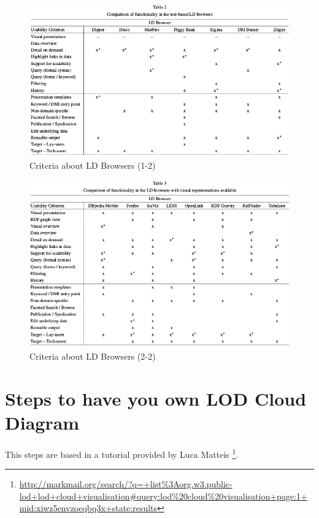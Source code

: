 \begin{figure}[tbp] 
  \centering
\includegraphics[width=\textwidth]{img/table2.png}
  \caption{Criteria about LD Browsers (1-2) \cite{Dadzie2011}}
  \label{fig:crit1}
\end{figure}

\begin{figure}[tbp] 
  \centering
\includegraphics[width=\textwidth]{img/table3.png}
  \caption{Criteria about LD Browsers (2-2) \cite{Dadzie2011}}
  \label{fig:crit2}
\end{figure}

\section{Steps to have you own LOD Cloud Diagram}

This steps are based in a tutorial provided by Luca Matteis \cite{Voidgraph} \footnote{\url{http://markmail.org/search/?q=+list\%3Aorg.w3.public-lod+lod+cloud+visualisation\#query:lod\%20cloud\%20visualisation+page:1+mid:xiwz5envzoeqbq3x+state:results}}.

